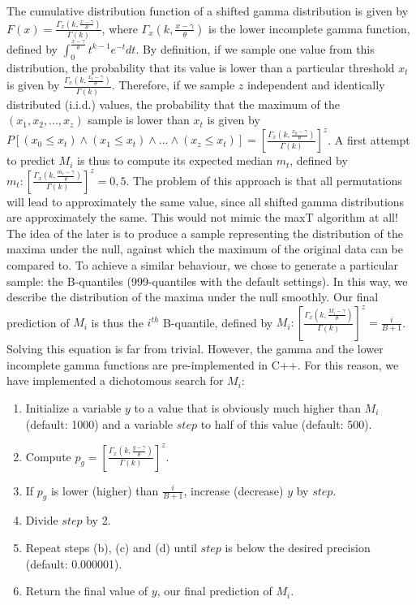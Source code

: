 \documentclass{bmcart}
\begin{document}
The cumulative distribution function of a shifted gamma distribution is given by $F(x) = \frac{\Gamma_x(k,\frac{x-\gamma}{\theta})}{\Gamma(k)}$, where $\Gamma_x(k,\frac{x-\gamma}{\theta})$ is the lower incomplete gamma function, defined by $\int_0^{\frac{x-\gamma}{\theta}}t^{k-1}e^{-t} dt$. By definition, if we sample one value from this distribution, the probability that its value is lower than a particular threshold $x_t$ is given by $\frac{\Gamma_x(k,\frac{x_t-\gamma}{\theta})}{\Gamma(k)}$. Therefore, if we sample $z$ independent and identically distributed (i.i.d.) values, the probability that the maximum of the $(x_1, x_2, ..., x_z)$ sample is lower than $x_t$ is given by $P[(x_0 \le x_t)\wedge(x_1 \le x_t) \wedge ... \wedge (x_z \le x_t)] = [\frac{\Gamma_x(k,\frac{x_0-\gamma}{\theta})}{\Gamma(k)}]^z$. A first attempt to predict $M_i$ is thus to compute its expected median $m_t$, defined by $m_t: [\frac{\Gamma_x(k,\frac{m_t-\gamma}{\theta})}{\Gamma(k)}]^z = 0,5$. The problem of this approach is that all permutations will lead to approximately the same value, since all shifted gamma distributions are approximately the same. This would not mimic the maxT algorithm at all! The idea of the later is to produce a sample representing the distribution of the maxima under the null, against which the maximum of the original data can be compared to. To achieve a similar behaviour, we chose to generate a particular sample: the B-quantiles (999-quantiles with the default settings). In this way, we describe the distribution of the maxima under the null smoothly. Our final prediction of $M_i$ is thus the $i^{th}$ B-quantile, defined by $M_i: [\frac{\Gamma_x(k,\frac{M_i-\gamma}{\theta})}{\Gamma(k)}]^z = \frac{i}{B+1}$. Solving this equation is far from trivial. However, the gamma and the lower incomplete gamma functions are pre-implemented in C++. For this reason, we have implemented a dichotomous search for $M_i$:
\begin{enumerate}[label=(\alph*)]
\item Initialize a variable $y$ to a value that is obviously much higher than $M_i$ (default: 1000) and a variable $step$ to half of this value (default: 500).
\item Compute $p_g = [\frac{\Gamma_x(k,\frac{y-\gamma}{\theta})}{\Gamma(k)}]^z$.
\item If $p_g$ is lower (higher) than $\frac{i}{B+1}$, increase (decrease) $y$ by $step$.
\item Divide $step$ by 2.
\item Repeat steps (b), (c) and (d) until $step$ is below the desired precision (default: 0.000001).
\item Return the final value of $y$, our final prediction of $M_i$.
\end{enumerate}
\end{document}
